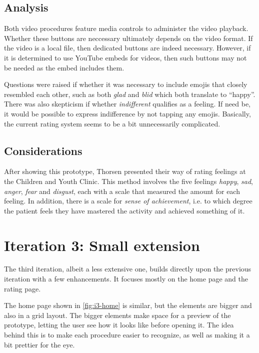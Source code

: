 \subsection{Analysis}

Both video procedures feature media controls to administer the video playback. Whether these buttons are neccessary ultimately depends on the video format. If the video is a local file, then dedicated buttons are indeed necessary. However, if it is determined to use YouTube embeds for videos, then such buttons may not be needed as the embed includes them.

Questions were raised if whether it was necessary to include emojis that closely resembled each other, such as both \emph{glad} and \emph{blid} which both translate to \enquote{happy}. There was also skepticism if whether \emph{indifferent} qualifies as a feeling. If need be, it would be possible to express indifference by not tapping any emojis. Basically, the current rating system seems to be a bit unnecessarily complicated.

\subsection{Considerations}

After showing this prototype, Thorsen presented their way of rating feelings at the Children and Youth Clinic. This method involves the five feelings \emph{happy}, \emph{sad}, \emph{anger}, \emph{fear} and \emph{disgust}, each with a scale that measured the amount for each feeling. In addition, there is a scale for \emph{sense of achievement}, i.e. to which degree the patient feels they have mastered the activity and achieved something of it.

\section{Iteration 3: Small extension}
\label{sec:iteration3}

The third iteration, albeit a less extensive one, builds directly upon the previous iteration with a few enhancements. It focuses mostly on the home page and the rating page.

The home page shown in \autoref{fig:i3-home} is similar, but the elements are bigger and also in a grid layout. The bigger elements make space for a preview of the prototype, letting the user see how it looks like before opening it. The idea behind this is to make each procedure easier to recognize, as well as making it a bit prettier for the eye.

